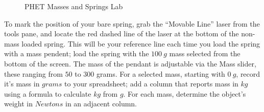 \documentclass[14pt]{article}
\begin{document}
%
%
\begin{figure}
    \centering
    \caption{PHET Masses and Springs Lab}
    \label{fig:phet-mass-and-spring-lab-1}
\end{figure}

To mark the position of your bare spring, grab the ``Movable Line'' laser from the tools pane, and locate the red dashed line of the laser at the bottom of the non-mass loaded spring. This will be your reference line each time you load the spring with a mass pendent; load the spring with the $100~g$ mass selected from the bottom of the screen.  The mass of the pendant is adjustable via the Mass slider, these ranging from $50$ to $300$ grams.  For a selected mass, starting with $0~g$, record it's mass in $grams$ to your spreadsheet; add a column that reports mass in $kg$ using a formula to calculate $kg$ from $g$. For each mass, determine the object's weight in $Newtons$ in an adjacent column. 
\end{document}
